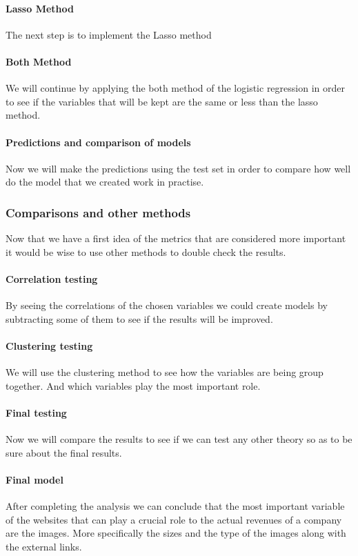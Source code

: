 \documentclass{article}
\begin{document}
\paragraph{Lasso Method}
The next step is to implement the Lasso method
\paragraph{Both Method}
We will continue by applying the both method of the logistic regression in order to see if the variables that will be kept are the same or less than the lasso method.
\paragraph{Predictions and comparison of models}
Now we will make the predictions using the test set in order to compare how well do the model that we created work in practise.
\subsubsection{Comparisons and other methods}
Now that we have a first idea of the metrics that are considered more important it would be wise to use other methods to double check the results.
\paragraph{Correlation testing}
By seeing the correlations of the chosen variables we could create models by subtracting some of them to see if the results will be improved.
\paragraph{Clustering testing}
We will use the clustering method to see how the variables are being group together. And which variables play the most important role.
\paragraph{Final testing}
Now we will compare the results to see if we can test any other theory so as to be sure about the final results.
\paragraph{Final model}
After completing the analysis we can conclude that the most important variable of the websites that can play a crucial role to the actual revenues of a company are the images. More specifically the sizes and the type of the images along with the external links.
\pagebreak  
\end{document}
